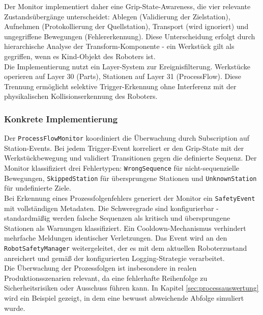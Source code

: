 \noindent
Der Monitor implementiert daher eine Grip-State-Awareness, die vier
relevante Zustandsübergänge unterscheidet: Ablegen (Validierung der Zielstation),
Aufnehmen (Protokollierung der Quellstation), Transport (wird ignoriert) und
ungegriffene Bewegungen (Fehlererkennung). Diese Unterscheidung erfolgt durch
hierarchische Analyse der Transform-Komponente - ein Werkstück gilt als
gegriffen, wenn es Kind-Objekt des Roboters ist.\\

\noindent
Die Implementierung nutzt ein Layer-System zur Ereignisfilterung. Werkstücke
operieren auf Layer 30 (Parts), Stationen auf Layer 31 (ProcessFlow). Diese
Trennung ermöglicht selektive Trigger-Erkennung ohne Interferenz mit der
physikalischen Kollisionserkennung des Roboters.

\subsubsection{Konkrete Implementierung}
\noindent
Der \texttt{ProcessFlowMonitor} koordiniert die Überwachung durch Subscription
auf Station-Events. Bei jedem Trigger-Event korreliert er den Grip-State mit
der Werkstückbewegung und validiert Transitionen gegen die definierte Sequenz.
Der Monitor klassifiziert drei Fehlertypen: \texttt{WrongSequence} für
nicht-sequenzielle Bewegungen, \texttt{SkippedStation} für übersprungene
Stationen und \texttt{UnknownStation} für undefinierte Ziele.\\

\noindent
Bei Erkennung eines Prozessfolgenfehlers generiert der Monitor ein \texttt{SafetyEvent} mit
vollständigen Metadaten. Die Schweregrade sind konfigurierbar - standardmäßig
werden falsche Sequenzen als kritisch und übersprungene Stationen als Warnungen
klassifiziert. Ein Cooldown-Mechanismus verhindert mehrfache Meldungen
identischer Verletzungen. Das Event wird an den \texttt{RobotSafetyManager}
weitergeleitet, der es mit dem aktuellen Roboterzustand anreichert und gemäß
der konfigurierten Logging-Strategie verarbeitet.\\

\noindent
Die Überwachung der Prozessfolgen ist insbesondere in realen
Produktionsszenarien relevant, da eine fehlerhafte Reihenfolge
zu Sicherheitsrisiken oder Ausschuss führen kann.
In Kapitel \ref{sec:processauswertung} wird ein Beispiel gezeigt, in dem eine bewusst
abweichende Abfolge simuliert wurde.
